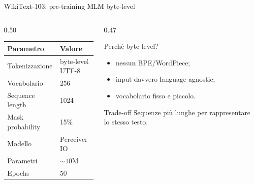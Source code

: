 \documentclass[aspectratio=169,10pt]{beamer}
\begin{document}
\begin{frame}{WikiText-103: pre-training MLM byte-level}
\small
\begin{columns}[T]
\begin{column}{0.50\textwidth}
\begin{tabular}{ll}
\toprule
\textbf{Parametro} & \textbf{Valore} \\
\midrule
Tokenizzazione & byte-level UTF-8 \\
Vocabolario & 256 \\
Sequence length & 1024 \\
Mask probability & 15\% \\
Modello & Perceiver IO \\
Parametri & $\sim10$M \\
Epochs & 50 \\
\bottomrule
\end{tabular}
\end{column}
\begin{column}{0.47\textwidth}
\begin{exampleblock}{Perché byte-level?}
\begin{itemize}
  \item nessun BPE/WordPiece;
  \item input davvero language-agnostic;
  \item vocabolario fisso e piccolo.
\end{itemize}
\end{exampleblock}
\begin{alertblock}{Trade-off}
Sequenze più lunghe per rappresentare lo stesso testo.
\end{alertblock}
\end{column}
\end{columns}
\end{frame}
\end{document}
